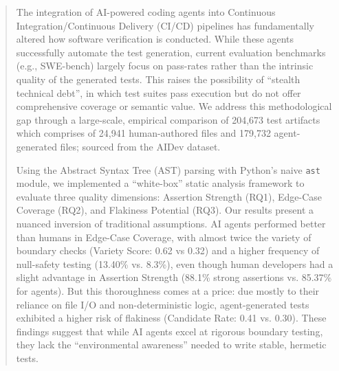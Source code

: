 \documentclass[conference]{IEEEtran}
\begin{document}
\maketitle
\begingroup
\renewcommand\thefootnote{\IEEEauthorrefmark{1}}
\endgroup
\begin{abstract}
The integration of AI-powered coding agents into Continuous Integration/Continuous Delivery (CI/CD) pipelines has fundamentally altered how software verification is conducted. While these agents successfully automate the test generation, current evaluation benchmarks (e.g., SWE-bench) largely focus on pass-rates rather than the intrinsic quality of the generated tests. This raises the possibility of ``stealth technical debt'', in which test suites pass execution but do not offer comprehensive coverage or semantic value. We address this methodological gap through a large-scale, empirical comparison of 204,673 test artifacts which comprises of 24,941 human-authored files and 179,732 agent-generated files; sourced from the AIDev dataset.

Using the Abstract Syntax Tree (AST) parsing with Python's naive \texttt{ast} module, we implemented a ``white-box'' static analysis framework to evaluate three quality dimensions: Assertion Strength (RQ1), Edge-Case Coverage (RQ2), and Flakiness Potential (RQ3). Our results present a nuanced inversion of traditional assumptions. AI agents performed better than humans in Edge-Case Coverage, with almost twice the variety of boundary checks (Variety Score: 0.62 vs 0.32) and a higher frequency of null-safety testing (13.40\% vs. 8.3\%), even though human developers had a slight advantage in Assertion Strength (88.1\% strong assertions vs. 85.37\% for agents). But this thoroughness comes at a price: due mostly to their reliance on file I/O and non-deterministic logic, agent-generated tests exhibited a higher risk of flakiness (Candidate Rate: 0.41 vs. 0.30). These findings suggest that while AI agents excel at rigorous boundary testing, they lack the ``environmental awareness'' needed to write stable, hermetic tests.
\end{abstract}
\end{document}
